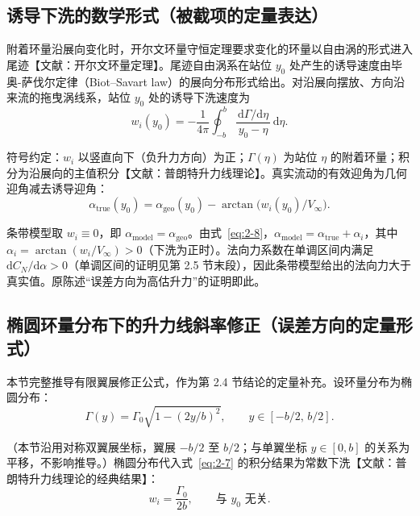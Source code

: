 \documentclass[11pt,a4paper]{ctexart}
\numberwithin{equation}{section}
\begin{document}
\subsection{诱导下洗的数学形式（被截项的定量表达）}

附着环量沿展向变化时，开尔文环量守恒定理要求变化的环量以自由涡的形式进入尾迹【文献：开尔文环量定理】。尾迹自由涡系在站位 $y_0$ 处产生的诱导速度由毕奥-萨伐尔定律（Biot--Savart law）的展向分布形式给出。对沿展向摆放、方向沿来流的拖曳涡线系，站位 $y_0$ 处的诱导下洗速度为
\begin{equation}
  w_i(y_0) = -\frac{1}{4\pi}\oint_{-b}^{b} \frac{\,\mathrm{d}\Gamma/\mathrm{d}\eta\,}{y_0 - \eta}\,\mathrm{d}\eta. \label{eq:2-7}
\end{equation}

符号约定：$w_i$ 以竖直向下（负升力方向）为正；$\Gamma(\eta)$ 为站位 $\eta$ 的附着环量；积分为沿展向的主值积分【文献：普朗特升力线理论】。真实流动的有效迎角为几何迎角减去诱导迎角：
\begin{equation}
  \alpha_{\text{true}}(y_0) = \alpha_{\text{geo}}(y_0) - \arctan\bigl(w_i(y_0)/V_\infty\bigr). \label{eq:2-8}
\end{equation}

条带模型取 $w_i \equiv 0$，即 $\alpha_{\text{model}} = \alpha_{\text{geo}}$。由式~\eqref{eq:2-8}，$\alpha_{\text{model}} = \alpha_{\text{true}} + \alpha_i$，其中 $\alpha_i = \arctan(w_i/V_\infty) > 0$（下洗为正时）。法向力系数在单调区间内满足 $\mathrm{d}C_N/\mathrm{d}\alpha > 0$（单调区间的证明见第 2.5 节末段），因此条带模型给出的法向力大于真实值。原陈述“误差方向为高估升力”的证明即此。

\subsection{椭圆环量分布下的升力线斜率修正（误差方向的定量形式）}

本节完整推导有限翼展修正公式，作为第 2.4 节结论的定量补充。设环量分布为椭圆分布：
\begin{equation}
  \Gamma(y) = \Gamma_0\sqrt{1 - (2y/b)^2}, \qquad y \in [-b/2,\, b/2]. \label{eq:2-9}
\end{equation}

（本节沿用对称双翼展坐标，翼展 $-b/2$ 至 $b/2$；与单翼坐标 $y \in [0, b]$ 的关系为平移，不影响推导。）椭圆分布代入式~\eqref{eq:2-7} 的积分结果为常数下洗【文献：普朗特升力线理论的经典结果】：
\begin{equation}
  w_i = \frac{\Gamma_0}{2b}, \qquad \text{与 } y_0 \text{ 无关}. \label{eq:2-10}
\end{equation}
\end{document}
